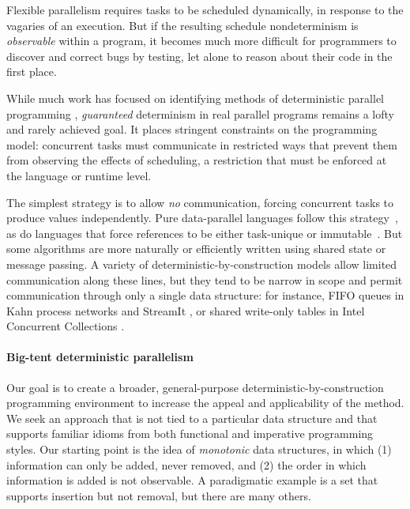 
Flexible parallelism requires tasks to be scheduled dynamically, in response to
the vagaries of an execution.  But if the resulting schedule nondeterminism is
\emph{observable} within a program, it becomes much more difficult for
programmers to discover and correct bugs by testing, let alone to reason about
their code in the first place.

While much work has focused on identifying methods of deterministic parallel
programming \cite{CnC, concurrent-revisions-haskell11, dpj-oopsla,
  Kahn-1974,Lee-sdn,Tesler-1968}, {\em guaranteed} determinism in real parallel
programs remains a lofty and rarely achieved goal.  It places stringent
constraints on the programming model: concurrent tasks must communicate in
restricted ways that prevent them from observing the effects of scheduling, a
restriction that must be enforced at the language or runtime level.

The simplest strategy is to allow \emph{no} communication, forcing
concurrent tasks to produce values independently.  Pure data-parallel languages
follow this strategy~\cite{dph}, as do languages that force references to be
either task-unique or immutable~\cite{dpj-oopsla}.  But some algorithms are
more naturally or efficiently written using shared state or message passing.  A
variety of deterministic-by-construction models allow limited communication
along these lines, but they tend to be narrow in scope and 
permit communication through only a
single data structure: for instance, FIFO queues in Kahn process networks
\cite{Kahn-1974} and StreamIt \cite{streamit-asplos}, or shared write-only
tables in Intel Concurrent Collections \cite{CnC}.

\paragraph{Big-tent deterministic parallelism}

Our goal is to create a broader, general-purpose deterministic-by-construction
programming environment to increase the appeal and applicability of the method.
We seek an approach that is not tied to a particular data structure and that
supports familiar idioms from both functional and imperative programming styles.
Our starting point is the idea of \emph{monotonic} data structures,
in which (1) information can only be added, never removed, and (2) the order in
which information is added is not observable.  A paradigmatic example is a set
that supports insertion but not removal, but there are many others.  


